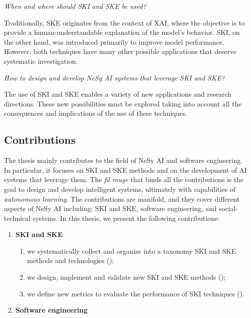 \begin{refsection}
\begin{questions}
    \item \emph{When and where should \gls{SKI} and \gls{SKE} be used?}

    Traditionally, \gls{SKE} originates from the context of \gls{XAI}, where the objective is to provide a human-understandable explanation of the model's behavior.
    \Gls{SKI}, on the other hand, was introduced primarily to improve model performance.
    However, both techniques have many other possible applications that deserve systematic investigation.
    \label{itm:rq3}

    \item \emph{How to design and develop \gls{NeSy} \gls{AI} systems that leverage \gls{SKI} and \gls{SKE}?}

    The use of \gls{SKI} and \gls{SKE} enables a variety of new applications and research directions.
    These new possibilities must be explored taking into account all the consequences and implications of the use of these techniques.
    \label{itm:rq4}
\end{questions}



\subsection*{Contributions}
%
The thesis mainly contributes to the field of \gls{NeSy} \gls{AI} and software engineering.
%
In particular, it focuses on \gls{SKI} and \gls{SKE} methods and on the development of \gls{AI} systems that leverage them.
%
The \textit{fil rouge} that binds all the contributions is the goal to design and develop intelligent systems, ultimately with capabilities of \emph{autonomous learning}.
%
The contributions are manifold, and they cover different aspects of \gls{NeSy} \gls{AI} including: \gls{SKI} and \gls{SKE}, software engineering, and social-technical systems.
%
In this thesis, we present the following contributions:
%
\begin{enumerate}[label=\emph{(\roman*)}]
    \item \textbf{\gls{SKI} and \gls{SKE}}

    \begin{enumerate}[label=\emph{(\arabic*)},resume]
        \item we systematically collect and organise into a taxonomy \gls{SKI} and \gls{SKE} methods and technologies ();
        \item we design, implement and validate new \gls{SKI} and \gls{SKE} methods ();
        \item we define new metrics to evaluate the performance of \gls{SKI} techniques ().
    \end{enumerate}
    \item \textbf{Software engineering}


\end{enumerate}
\end{refsection}

